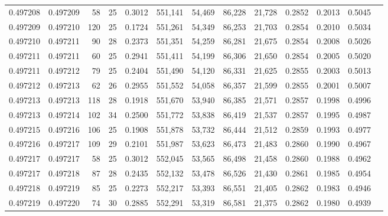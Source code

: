 \begin{tabular}{rrrrrrrrrrrrr}
0.497208 & 0.497209 &  58 &  25 &                                     0.3012 & 551,141 &  54,469 &  86,228 &  21,728 & 0.2852 & 0.2013 & 0.5045 \\
0.497209 & 0.497210 & 120 &  25 &                                     0.1724 & 551,261 &  54,349 &  86,253 &  21,703 & 0.2854 & 0.2010 & 0.5034 \\
0.497210 & 0.497211 &  90 &  28 &                                     0.2373 & 551,351 &  54,259 &  86,281 &  21,675 & 0.2854 & 0.2008 & 0.5026 \\
0.497211 & 0.497211 &  60 &  25 &                                     0.2941 & 551,411 &  54,199 &  86,306 &  21,650 & 0.2854 & 0.2005 & 0.5020 \\
0.497211 & 0.497212 &  79 &  25 &                                     0.2404 & 551,490 &  54,120 &  86,331 &  21,625 & 0.2855 & 0.2003 & 0.5013 \\
0.497212 & 0.497213 &  62 &  26 &                                     0.2955 & 551,552 &  54,058 &  86,357 &  21,599 & 0.2855 & 0.2001 & 0.5007 \\
0.497213 & 0.497213 & 118 &  28 &                                     0.1918 & 551,670 &  53,940 &  86,385 &  21,571 & 0.2857 & 0.1998 & 0.4996 \\
0.497213 & 0.497214 & 102 &  34 &                                     0.2500 & 551,772 &  53,838 &  86,419 &  21,537 & 0.2857 & 0.1995 & 0.4987 \\
0.497215 & 0.497216 & 106 &  25 &                                     0.1908 & 551,878 &  53,732 &  86,444 &  21,512 & 0.2859 & 0.1993 & 0.4977 \\
0.497216 & 0.497217 & 109 &  29 &                                     0.2101 & 551,987 &  53,623 &  86,473 &  21,483 & 0.2860 & 0.1990 & 0.4967 \\
0.497217 & 0.497217 &  58 &  25 &                                     0.3012 & 552,045 &  53,565 &  86,498 &  21,458 & 0.2860 & 0.1988 & 0.4962 \\
0.497217 & 0.497218 &  87 &  28 &                                     0.2435 & 552,132 &  53,478 &  86,526 &  21,430 & 0.2861 & 0.1985 & 0.4954 \\
0.497218 & 0.497219 &  85 &  25 &                                     0.2273 & 552,217 &  53,393 &  86,551 &  21,405 & 0.2862 & 0.1983 & 0.4946 \\
0.497219 & 0.497220 &  74 &  30 &                                     0.2885 & 552,291 &  53,319 &  86,581 &  21,375 & 0.2862 & 0.1980 & 0.4939 \\

\end{tabular}

